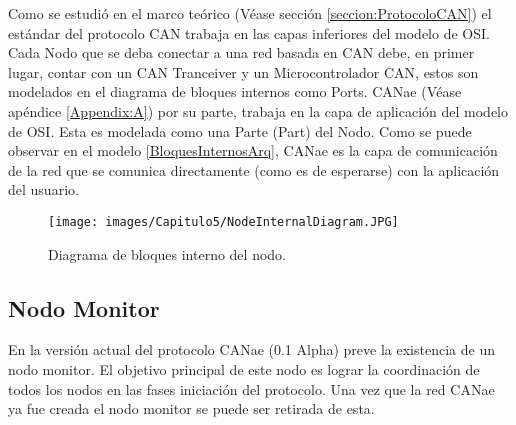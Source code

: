 Como se estudió en el marco teórico (Véase sección \ref{seccion:ProtocoloCAN})
el estándar del protocolo CAN \citep{can-ciaWEB} trabaja en las capas
inferiores del modelo de OSI. Cada Nodo que se deba conectar a una red basada
en CAN debe, en primer lugar, contar con un CAN Tranceiver y un
Microcontrolador CAN, estos son modelados en el diagrama de bloques
internos como Ports. CANae (Véase apéndice \ref{Appendix:A}) por su parte,
trabaja en la capa de aplicación del modelo de OSI. Esta es modelada como
una Parte (Part) del Nodo. Como se puede observar en el modelo
\ref{BloquesInternosArq}, CANae es la capa de comunicación de la red
que se comunica directamente (como es de esperarse) con la aplicación
del usuario. 

\begin{figure}[h!]
 \centering
 \texttt{[image: images/Capitulo5/NodeInternalDiagram.JPG]}
 \caption{Diagrama de bloques interno del nodo.}
\label{fig:BloquesInternosArq}
\end{figure}

\subsection{Nodo Monitor}
En la versión actual del protocolo CANae (0.1 Alpha) preve la existencia de un
nodo monitor. El objetivo principal de este nodo es lograr la coordinación 
de todos los nodos en las fases iniciación del protocolo. Una vez que la red
CANae ya fue creada el nodo monitor se puede ser retirada de esta.  
